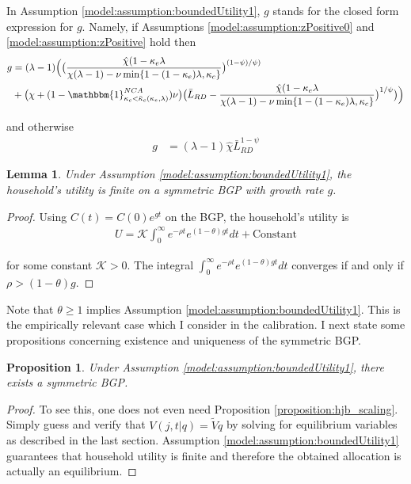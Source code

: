 \documentclass[11pt,english]{article}
\newtheorem{proposition}{Proposition}
\newtheorem{lemma}{Lemma}
\begin{document}
In Assumption \ref{model:assumption:boundedUtility1}, $g$ stands for the closed form expression for $g$. Namely, if Assumptions \ref{model:assumption:zPositive0} and \ref{model:assumption:zPositive} hold then 
\begin{align}
g &= (\lambda - 1) \Big(  \big( \frac{\hat{\chi} (1-\kappa_e \lambda}{\chi(\lambda-1) - \nu \min \{1 - (1-\kappa_e) \lambda, \kappa_c \}} \big)^{(1-\psi)/\psi)} \\
&+ \big(\chi + (1- \mathbbm{1}^{NCA}_{\kappa_c < \bar{\kappa}_c(\kappa_e,\lambda)})\nu \big) \big( \bar{L}_{RD} -  \frac{\hat{\chi} (1-\kappa_e \lambda}{\chi(\lambda-1) - \nu \min \{1 - (1-\kappa_e) \lambda, \kappa_c \}} \big)^{1/\psi} \big) \Big) 
\end{align}

and otherwise
\begin{align}
g &= (\lambda -1) \hat{\chi} \bar{L}_{RD}^{1-\psi}
\end{align}

\begin{lemma}
	Under Assumption \ref{model:assumption:boundedUtility1}, the household's utility is finite on a symmetric BGP with growth rate $g$.
\end{lemma}

\begin{proof}
	Using $C(t) = C(0)e^{gt}$ on the BGP, the household's utility is
	\begin{align}
		U = \mathcal{K} \int_0^{\infty} e^{-\rho t} e^{(1-\theta)gt} dt + \text{Constant}
	\end{align}
	
	for some constant $\mathcal{K} > 0$. The integral $\int_0^{\infty} e^{-\rho t} e^{(1-\theta)gt} dt$ converges if and only if $\rho > (1-\theta)g$. 
\end{proof}

Note that $\theta \ge 1$ implies Assumption \ref{model:assumption:boundedUtility1}. This is the empirically relevant case which I consider in the calibration. I next state some propositions concerning existence and uniqueness of the symmetric BGP. 

\begin{proposition}\label{proposition:BGPexistence}
	Under Assumption \ref{model:assumption:boundedUtility1}, there exists a symmetric BGP.
\end{proposition}

\begin{proof}
	To see this, one does not even need Proposition \ref{proposition:hjb_scaling}. Simply guess and verify that $V(j,t|q) = \tilde{V} q$ by solving for equilibrium variables as described in the last section. Assumption \ref{model:assumption:boundedUtility1} guarantees that household utility is finite and therefore the obtained allocation is actually an equilibrium.
\end{proof}
\end{document}
